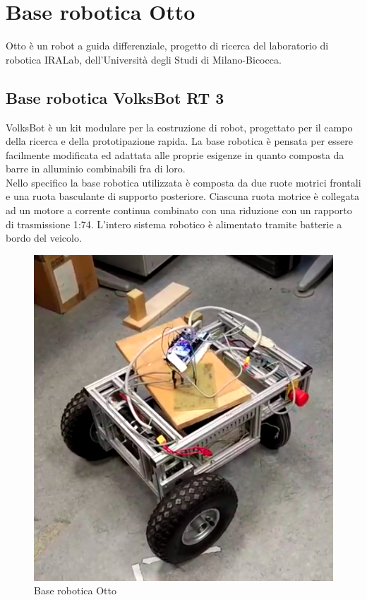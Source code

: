 \chapter{Base robotica Otto}

Otto è un robot a guida differenziale, progetto di ricerca del laboratorio di robotica IRALab, dell’Università degli Studi di Milano-Bicocca.

\section{Base robotica VolksBot RT 3}
VolksBot è un kit modulare per la costruzione di robot, progettato per il campo della ricerca e della  prototipazione rapida.
La base robotica è pensata per essere facilmente modificata ed adattata alle proprie esigenze in quanto composta da barre in alluminio combinabili fra di loro. \\
Nello specifico la base robotica utilizzata è composta da due ruote motrici frontali e una ruota basculante di supporto posteriore.
Ciascuna ruota motrice è collegata ad un motore a corrente continua combinato con una riduzione con un rapporto di trasmissione 1:74.
L'intero sistema robotico è alimentato tramite batterie a bordo del veicolo.
\begin{figure}[H]
\centering
\includegraphics[scale=0.45]{images/otto1.png}
\caption{Base robotica Otto}
\end{figure}

